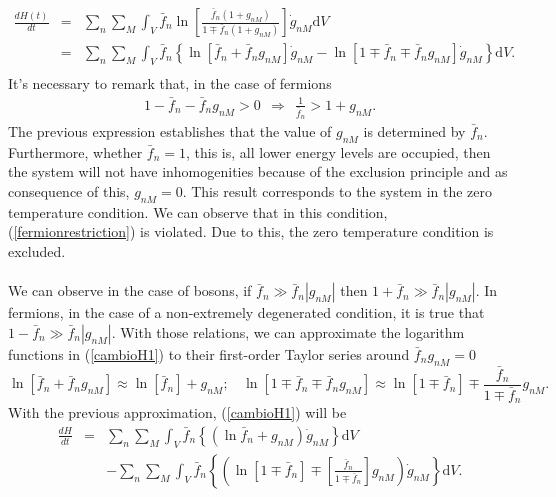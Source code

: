 \documentclass{article}
\begin{document}
\begin{eqnarray}
    \frac{dH(t)}{dt}&=&\sum_n \sum_M \int_V\bar{f}_{n}\ln \left[ \frac{\bar{f}_{n}(1+g_{nM})}{1\mp \bar{f}_{n} (1+ g_{nM})} \right]\dot{g}_{nM}\mathrm{d}V \nonumber \\
    &=&\sum_n \sum_M \int_V\bar{f}_n \left \{ \ln [\bar{f}_n+\bar{f}_n g_{nM}]\dot{g}_{nM}-\ln [1\mp\bar{f}_n\mp\bar{f}_n g_{nM}]\dot{g}_{nM}  \right \}\mathrm{d}V.\nonumber \\
    \label{cambioH1}
\end{eqnarray}{}
It's necessary to remark that, in the case of fermions
\begin{eqnarray}
   1-\bar f_n -\bar f_n g_{nM}>0 \ \ \Rightarrow \ \ \frac{1}{\bar f_n}>1+g_{nM}. \label{fermionrestriction}
\end{eqnarray}{}
The previous expression establishes that the value of $g_{nM}$ is determined by $\bar f_n$. Furthermore, whether $\bar f_{n}=1$, this is, all lower energy levels are occupied, then the system will not have inhomogenities because of the exclusion principle and as consequence of this,  $g_{nM}=0$. This result corresponds to the system in the zero temperature condition. We can observe that in this condition, (\ref{fermionrestriction}) is violated. Due to this, the zero temperature condition is excluded.\\
\\
We can observe in the case of bosons, if $\bar{f}_n \gg \bar{f}_n |g_{nM}|$ then $1+\bar{f}_n \gg \bar{f}_n |g_{nM}|$. In fermions, in the case of a non-extremely degenerated condition, it is true that $1-\bar{f}_n \gg \bar{f}_n |g_{nM}|$. With those relations, we can approximate the logarithm functions in (\ref{cambioH1}) to their first-order Taylor series around $\bar f_n g_{nM}=0$ 
\begin{equation}
    \ln [\bar{f}_n+\bar{f}_n g_{nM}] \approx \ln [\bar{f}_n]+ g_{nM}; \ \ \ \ \ln[1\mp\bar{f}_n\mp\bar{f}_n g_{nM}] \approx \ln[1\mp\bar{f}_n]\mp\frac{\bar{f}_n}{1\mp\bar{f}_{n}} g_{nM}. \label{lnapproximation}
\end{equation}{}
With the previous approximation, (\ref{cambioH1}) will be
\begin{eqnarray}
    \frac{dH}{dt}&=&\sum_n \sum_M \int_V\bar{f}_n\left \{ (\ln \bar{f}_n+ g_{nM})\dot{g}_{nM}\right\}\mathrm{d}V \nonumber \\
    &&-\sum_{n}\sum_{M}\int_V\bar f_n\left\{ \left( \ln[1\mp\bar{f}_n]\mp \left[\frac{\bar{f}_n}{1\mp\bar{f}_n} \right] g_{nM}\right)\dot{g}_{nM} \right \}\mathrm{d}V.\label{cambioH2}
\end{eqnarray}{}
\end{document}
